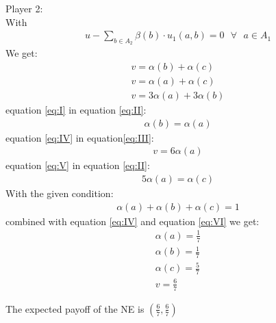 \documentclass[a4paper,
  twoside, %
  headlines=2.1 %
  ]{scrartcl}
\begin{document}
Player 2:\\
With
\begin{align}
    u - \sum_{b \in A_2} \beta(b) \cdot u_1(a,b) = 0 \text{ } \forall \text{ } a \in A_1
\end{align}
We get:
\begin{align}
    v=\alpha(b)+\alpha(c) \label{eq:I}\\
    v=\alpha(a)+\alpha(c) \label{eq:II}\\
    v=3\alpha(a)+3\alpha(b) \label{eq:III}
\end{align}
equation \ref{eq:I} in equation \ref{eq:II}:
\begin{align}
    \alpha(b) = \alpha(a) \label{eq:IV}
\end{align}
equation \ref{eq:IV} in equation\ref{eq:III}:
\begin{align}
    v=6\alpha(a) \label{eq:V}
\end{align}
equation \ref{eq:V} in equation \ref{eq:II}:
\begin{align}
    5\alpha(a) = \alpha(c) \label{eq:VI}
\end{align}
With the given condition:
\begin{align}
    \alpha(a)+\alpha(b)+\alpha(c) =1
\end{align}
combined with equation \ref{eq:IV} and equation \ref{eq:VI} we get:
\begin{align}
    \alpha(a) = \frac{1}{7}\\
    \alpha(b) = \frac{1}{7}\\
    \alpha(c) = \frac{5}{7}\\
    v = \frac{6}{7}
\end{align}

The expected payoff of the NE is $(\frac{6}{7}, \frac{6}{7})$
\end{document}
